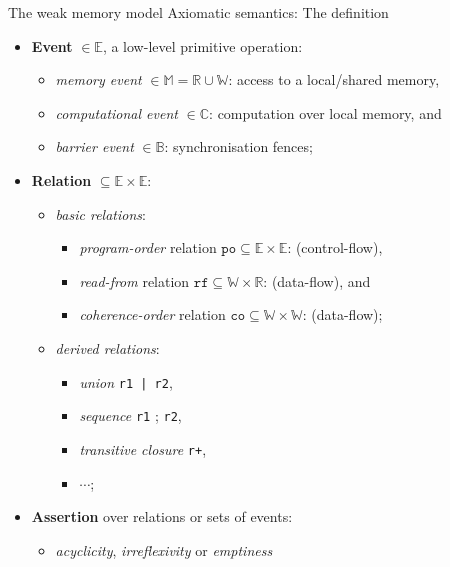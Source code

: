 \documentclass{beamer}
\begin{document}
\begin{frame}{The weak memory model} {Axiomatic semantics: The definition}

\begin{itemize}
  \addtolength{\tabcolsep}{0pt}
  \item \textbf{Event} $\in \mathbb{E}$, a low-level primitive operation:
    \begin{itemize}
      \item \textit{memory event} $\in \mathbb{M} = \mathbb{R} \cup \mathbb{W}$: access to a local/shared memory, \\
      \item \textit{computational event} $\in \mathbb{C}$: computation over local memory, and \\
      \item \textit{barrier event} $\in \mathbb{B}$: synchronisation fences;
     \end{itemize}
  \item \textbf{Relation} $\subseteq \mathbb{E} \times \mathbb{E}$: 
    \begin{itemize}
    \item \textit{basic relations}:%
      \begin{itemize}
        \item \textit{program-order} relation $\texttt{po} \subseteq \mathbb{E} \times \mathbb{E}$: (control-flow),
        \item \textit{read-from} relation $\texttt{rf} \subseteq \mathbb{W} \times \mathbb{R}$: (data-flow), and
        \item \textit{coherence-order} relation $\texttt{co} \subseteq \mathbb{W} \times \mathbb{W}$: (data-flow);
      \end{itemize}
    \item \textit{derived relations}:%
      \begin{itemize}
        \item \textit{union} \texttt{r1\,|\,r2},
        \item \textit{sequence} \texttt{r1} ; \texttt{r2},
        \item \textit{transitive closure} \texttt{r+},
        \item $\cdots$;
      \end{itemize}
    \end{itemize}
  \item \textbf{Assertion} over relations or sets of events: 
    \begin{itemize}
    \item \textit{acyclicity}, \textit{irreflexivity} or \textit{emptiness} 
    \end{itemize}
\end{itemize}

\end{frame}
\end{document}
